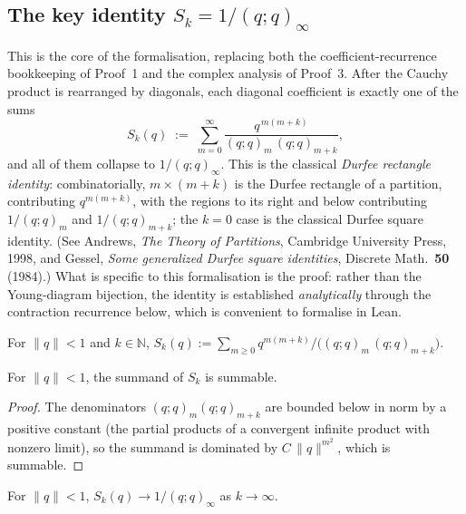 \subsection{The key identity \texorpdfstring{$S_k = 1/(q;q)_\infty$}{Sk = 1/(q;q)inf}}

This is the core of the formalisation, replacing both the
coefficient-recurrence bookkeeping of Proof~1 and the complex analysis of
Proof~3. After the Cauchy product is rearranged by diagonals, each diagonal
coefficient is exactly one of the sums
\[
  S_k(q) \;:=\; \sum_{m=0}^{\infty}
    \frac{q^{\,m(m+k)}}{(q;q)_m\,(q;q)_{m+k}},
\]
and all of them collapse to $1/(q;q)_\infty$. This is the classical
\emph{Durfee rectangle identity}: combinatorially, $m\times(m+k)$ is the Durfee
rectangle of a partition, contributing $q^{m(m+k)}$, with the regions to its
right and below contributing $1/(q;q)_m$ and $1/(q;q)_{m+k}$; the $k=0$ case is
the classical Durfee square identity. (See Andrews, \emph{The Theory of
Partitions}, Cambridge University Press, 1998, and Gessel, \emph{Some generalized Durfee square identities},
Discrete Math.\ \textbf{50} (1984).) What is specific to this formalisation is
the proof: rather than the Young-diagram bijection, the identity is established
\emph{analytically} through the contraction recurrence below, which is
convenient to formalise in Lean.

\begin{definition}\label{def:S-sum}\leanok{}
For $\|q\| < 1$ and $k \in \mathbb{N}$,
$S_k(q) := \sum_{m \ge 0} q^{m(m+k)} / \bigl((q;q)_m\,(q;q)_{m+k}\bigr)$.
\end{definition}

\begin{lemma}[Summability of $S_k$]\label{lem:summable-S}\leanok{}
For $\|q\| < 1$, the summand of $S_k$ is summable.
\end{lemma}

\begin{proof}\leanok
The denominators $(q;q)_m(q;q)_{m+k}$ are bounded below in norm by a positive
constant (the partial products of a convergent infinite product with nonzero
limit), so the summand is dominated by $C\,\|q\|^{m^2}$, which is summable.
\end{proof}

\begin{lemma}[Limit of $S_k$]\label{lem:S-sum-tendsto}\leanok{}
For $\|q\| < 1$, $S_k(q) \to 1/(q;q)_\infty$ as $k \to \infty$.
\end{lemma}

